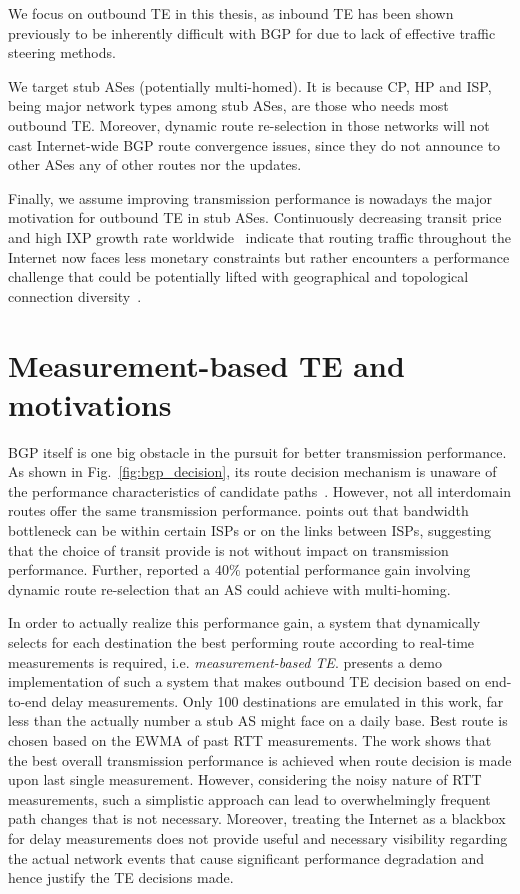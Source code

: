 We focus on outbound TE in this thesis, as inbound TE has been shown previously to be inherently difficult with BGP for due to lack of effective traffic steering methods.

We target stub ASes (potentially multi-homed).
It is because \ac{CP}, \ac{HP} and \ac{ISP}, being major network types among stub ASes, are those who needs most outbound TE.
Moreover, dynamic route re-selection in those networks will not cast Internet-wide BGP route convergence issues, since they do not announce to other ASes any of other routes nor the updates.

Finally, we assume improving transmission performance is nowadays the major motivation for outbound TE in stub ASes.
Continuously decreasing transit price~\cite{transitprice, drpeering} and high \ac{IXP} growth rate worldwide~\cite{pchixp} indicate that routing traffic throughout the Internet now faces less monetary constraints but rather encounters a performance challenge that could be potentially lifted with geographical and topological connection diversity~\cite{Chiu2015}.


\section{Measurement-based TE and motivations}

BGP itself is one big obstacle in the pursuit for better transmission performance.
As shown in Fig.~\ref{fig:bgp_decision}, its route decision mechanism is unaware of the performance characteristics of candidate paths~\cite{Yannuzzi2005}.
However, not all interdomain routes offer the same transmission performance. \citet{Akella2003} points out that bandwidth bottleneck can be within certain \acp{ISP} or on the links between \acp{ISP}, suggesting that the choice of transit provide is not without impact on transmission performance.
Further, \citet{Akella2003a} reported a $40\%$ potential performance gain involving dynamic route re-selection that an AS could achieve with multi-homing.

In order to actually realize this performance gain, a system that dynamically selects for each destination the best performing route according to real-time measurements is required, i.e. \textit{measurement-based TE}.
\citet{Akella2008} presents a demo implementation of such a system that makes outbound TE decision based on end-to-end delay measurements. Only 100 destinations are emulated in this work, far less than the actually number a stub AS might face on a daily base. Best route is chosen based on the \ac{EWMA} of past \ac{RTT} measurements. The work shows that the best overall transmission performance is achieved when route decision is made upon last single measurement. However, considering the noisy nature of \ac{RTT} measurements, such a simplistic approach can lead to overwhelmingly frequent path changes that is not necessary. Moreover, treating the Internet as a blackbox for delay measurements does not provide useful and necessary visibility regarding the actual network events that cause significant performance degradation and hence justify the TE decisions made. 

